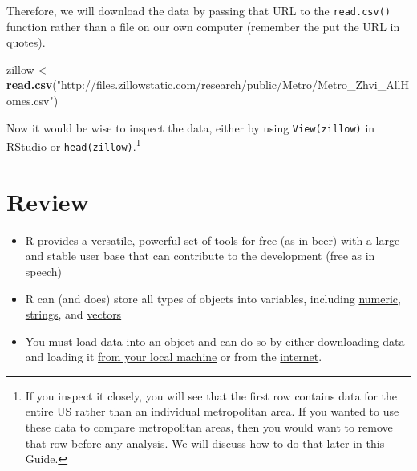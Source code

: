 \documentclass[]{article}
\newenvironment{Shaded}{\begin{snugshade}}{\end{snugshade}}
\newcommand{\KeywordTok}[1]{\textcolor[rgb]{0.13,0.29,0.53}{\textbf{{#1}}}}
\newcommand{\StringTok}[1]{\textcolor[rgb]{0.31,0.60,0.02}{{#1}}}
\newcommand{\NormalTok}[1]{{#1}}
\providecommand{\tightlist}{%
  \setlength{\itemsep}{0pt}\setlength{\parskip}{0pt}}
\let\rmarkdownfootnote\footnote%
\def\footnote{\protect\rmarkdownfootnote}
\begin{document}
Therefore, we will download the data by passing that URL to the
\texttt{read.csv()} function rather than a file on our own computer
(remember the put the URL in quotes).

\begin{Shaded}
\begin{Highlighting}[]
\NormalTok{zillow <-}\StringTok{ }\KeywordTok{read.csv}\NormalTok{(}\StringTok{"http://files.zillowstatic.com/research/public/Metro/Metro_Zhvi_AllHomes.csv"}\NormalTok{)}
\end{Highlighting}
\end{Shaded}

Now it would be wise to inspect the data, either by using
\texttt{View(zillow)} in RStudio or \texttt{head(zillow)}.\footnote{If
  you inspect it closely, you will see that the first row contains data
  for the entire US rather than an individual metropolitan area. If you
  wanted to use these data to compare metropolitan areas, then you would
  want to remove that row before any analysis. We will discuss how to do
  that later in this Guide.}

\section{Review}\label{review}

\begin{itemize}
\tightlist
\item
  R provides a versatile, powerful set of tools for free (as in beer)
  with a large and stable user base that can contribute to the
  development (free as in speech)
\item
  R can (and does) store all types of objects into variables, including
  \protect\hyperlink{vars_numeric}{numeric},
  \protect\hyperlink{vars_string}{strings}, and
  \protect\hyperlink{vars_vector}{vectors}
\item
  You must load data into an object and can do so by either downloading
  data and loading it \protect\hyperlink{data_local}{from your local
  machine} or from the \protect\hyperlink{data_internet}{internet}.
\end{itemize}
\end{document}
